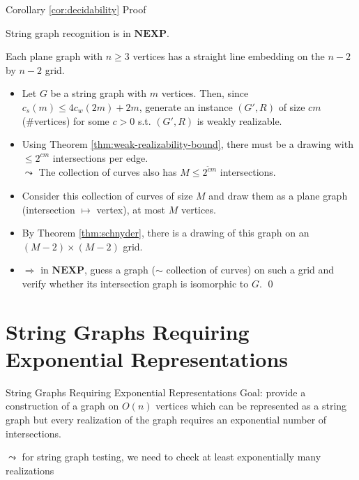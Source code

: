 \documentclass[10pt,aspectratio=169]{beamer}
\theoremstyle{plain}
\begin{document}
\addtocounter{theorem}{-2}
\begin{frame}[t]{Corollary \ref{cor:decidability} Proof}
    \begin{corollary}
        String graph recognition is in \(\mathbf{NEXP}\).
    \end{corollary}
    \begin{theorem}
        Each plane graph with \(n \geq 3\) vertices has a straight line embedding on the \(n-2\) by \(n-2\) grid.
        \label{thm:schnyder}
    \end{theorem}
    \begin{itemize}
        \item Let \(G\) be a string graph with \(m\) vertices. \pause
        Then, since \(c_s(m) \leq 4 c_w(2m) + 2m\), generate an instance \((G', R)\) of size \(c m\) (\#vertices) for some \(c > 0\) s.t.
        \((G', R)\) is weakly realizable.
        \item<3-> Using Theorem \ref{thm:weak-realizability-bound}, there must be a drawing with \(\leq 2^{cm}\) intersections per edge.\\
        \(\leadsto\) The collection of curves also has \(M \leq 2^{\tilde{c} m}\) intersections.
        \item<4-> Consider this collection of curves of size \(M\) and draw them as a plane graph \\(intersection \(\mapsto\) vertex), at most \(M\) vertices.
        \item<5-> By Theorem \ref{thm:schnyder}, there is a drawing of this graph on an \((M-2) \times (M-2)\) grid.
        \item<6-> \(\Rightarrow\) in \(\mathbf{NEXP}\), guess a graph (\(\sim\) collection of curves) on such a grid and verify whether its intersection graph is isomorphic to \(G\). \qed
    \end{itemize}
\end{frame}

\section{String Graphs Requiring Exponential Representations}

\begin{frame}{String Graphs Requiring Exponential Representations}
    Goal: provide a construction of a graph on \(O(n)\) vertices which can be represented
    as a string graph but every realization of the graph requires an exponential number of intersections.

    \(\leadsto\) for string graph testing, we need to check at least exponentially many realizations
\end{frame}
\end{document}
